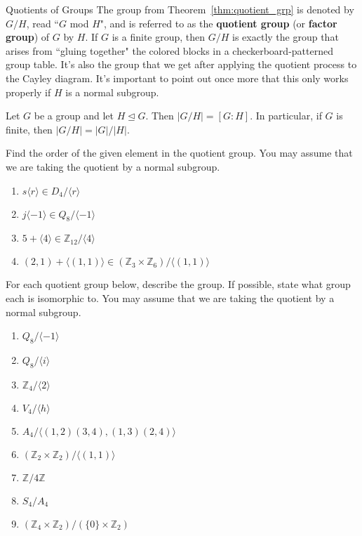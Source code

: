 \begin{section}{Quotients of Groups}
The group from Theorem~\ref{thm:quotient_grp} is denoted by $G/H$, read ``$G$ mod $H$", and is referred to as the \textbf{quotient group} (or \textbf{factor group}) of $G$ by $H$.  If $G$ is a finite group, then $G/H$ is exactly the group that arises from ``gluing together" the colored blocks in a checkerboard-patterned group table.  It's also the group that we get after applying the quotient process to the Cayley diagram.  It's important to point out once more that this only works properly if $H$ is a normal subgroup.

\begin{theorem}
Let $G$ be a group and let $H\trianglelefteq G$.  Then $|G/H|=[G:H]$.  In particular, if $G$ is finite, then $|G/H|=|G|/|H|$.
\end{theorem}

\begin{exercise}%
Find the order of the given element in the quotient group. You may assume that we are taking the quotient by a normal subgroup. 
\begin{enumerate}[label=\rm{(\alph*)}]
\item $s\langle r\rangle \in D_4/\langle r\rangle$
\item $j\langle -1\rangle \in Q_8/\langle -1\rangle$
\item $5+\langle 4\rangle \in \mathbb{Z}_{12}/\langle 4\rangle$
\item $(2,1)+\langle (1,1)\rangle \in (\mathbb{Z}_3\times \mathbb{Z}_6)/\langle (1,1)\rangle$ 
\end{enumerate}
\end{exercise}

\begin{exercise}
For each quotient group below, describe the group.  If possible, state what group each is isomorphic to.  You may assume that we are taking the quotient by a normal subgroup. 
\begin{enumerate}[label=\rm{(\alph*)}]
\item $Q_8/\langle -1\rangle$
\item $Q_8/\langle i\rangle$
\item $\mathbb{Z}_4/\langle 2\rangle$
\item $V_4/\langle h\rangle$
\item $A_4/\langle (1,2)(3,4),(1,3)(2,4)\rangle$
\item $(\mathbb{Z}_2\times \mathbb{Z}_2)/\langle (1,1)\rangle$
\item $\mathbb{Z}/4\mathbb{Z}$
\item $S_4/A_4$
\item $(\mathbb{Z}_4\times \mathbb{Z}_2)/(\{0\}\times \mathbb{Z}_2)$
\end{enumerate}
\end{exercise}


\end{section}

